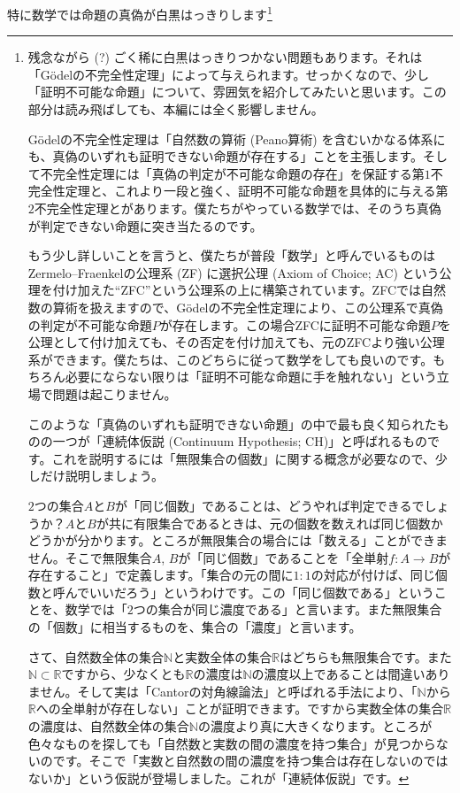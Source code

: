 特に数学では命題の真偽が白黒はっきりします\footnote{残念ながら (?) ごく稀に白黒はっきりつかない問題もあります。それは「G\"odelの不完全性定理」によって与えられます。せっかくなので、少し「証明不可能な命題」について、雰囲気を紹介してみたいと思います。この部分は読み飛ばしても、本編には全く影響しません。

G\"odelの不完全性定理は「自然数の算術 (Peano算術) を含むいかなる体系にも、真偽のいずれも証明できない命題が存在する」ことを主張します。そして不完全性定理には「真偽の判定が不可能な命題の存在」を保証する第$1$不完全性定理と、これより一段と強く、証明不可能な命題を具体的に与える第$2$不完全性定理とがあります。僕たちがやっている数学では、そのうち真偽が判定できない命題に突き当たるのです。

もう少し詳しいことを言うと、僕たちが普段「数学」と呼んでいるものはZermelo--Fraenkelの公理系 (ZF) に選択公理 (Axiom of Choice; AC) という公理を付け加えた``ZFC''という公理系の上に構築されています。ZFCでは自然数の算術を扱えますので、G\"odelの不完全性定理により、この公理系で真偽の判定が不可能な命題$P$が存在します。この場合ZFCに証明不可能な命題$P$を公理として付け加えても、その否定を付け加えても、元のZFCより強い公理系ができます。僕たちは、このどちらに従って数学をしても良いのです。もちろん必要にならない限りは「証明不可能な命題に手を触れない」という立場で問題は起こりません。

このような「真偽のいずれも証明できない命題」の中で最も良く知られたものの一つが「連続体仮説 (Continuum Hypothesis; CH)」と呼ばれるものです。これを説明するには「無限集合の個数」に関する概念が必要なので、少しだけ説明しましょう。

$2$つの集合$A$と$B$が「同じ個数」であることは、どうやれば判定できるでしょうか？$A$と$B$が共に有限集合であるときは、元の個数を数えれば同じ個数かどうかが分かります。ところが無限集合の場合には「数える」ことができません。そこで無限集合$A$, $B$が「同じ個数」であることを「全単射$f\colon A\rightarrow B$が存在すること」で定義します。「集合の元の間に$1:1$の対応が付けば、同じ個数と呼んでいいだろう」というわけです。この「同じ個数である」ということを、数学では「$2$つの集合が同じ濃度である」と言います。また無限集合の「個数」に相当するものを、集合の「濃度」と言います。

さて、自然数全体の集合$\mathbb{N}$と実数全体の集合$\mathbb{R}$はどちらも無限集合です。また$\mathbb{N}\subset\mathbb{R}$ですから、少なくとも$\mathbb{R}$の濃度は$\mathbb{N}$の濃度以上であることは間違いありません。そして実は「Cantorの対角線論法」と呼ばれる手法により、「$\mathbb{N}$から$\mathbb{R}$への全単射が存在しない」ことが証明できます。ですから実数全体の集合$\mathbb{R}$の濃度は、自然数全体の集合$\mathbb{N}$の濃度より真に大きくなります。ところが色々なものを探しても「自然数と実数の間の濃度を持つ集合」が見つからないのです。そこで「実数と自然数の間の濃度を持つ集合は存在しないのではないか」という仮説が登場しました。これが「連続体仮説」です。

}
